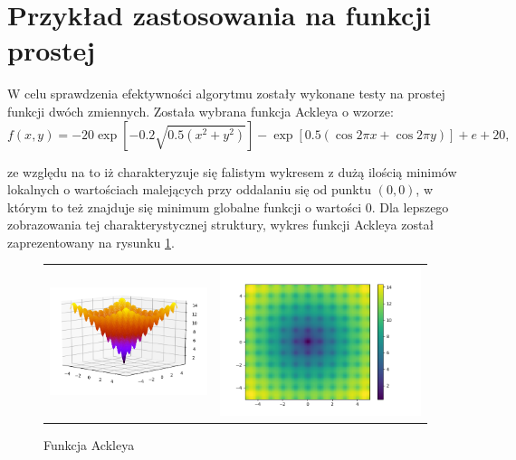
\section{Przykład zastosowania na funkcji prostej}
W celu sprawdzenia efektywności algorytmu zostały wykonane testy na prostej funkcji dwóch zmiennych. Została wybrana funkcja Ackleya o wzorze:
\begin{equation}
f(x,y) = -20\exp\left[-0.2\sqrt{0.5\left(x^{2}+y^{2}\right)}\right] -\exp\left[0.5\left(\cos 2\pi x + \cos 2\pi y \right)\right] + e + 20,
\end{equation}

ze względu na to iż charakteryzuje się falistym wykresem z dużą ilością minimów lokalnych o wartościach malejących przy oddalaniu się od punktu $(0, 0)$, w którym to też znajduje się minimum globalne funkcji o wartości 0. Dla lepszego zobrazowania tej charakterystycznej struktury, wykres funkcji Ackleya został zaprezentowany na rysunku \ref{fig:ackley}.

\begin{figure}[H]
    \centering
    \begin{tabular}{cc}
         \includegraphics[width=0.5\linewidth]{figures/ackley1.png}& \includegraphics[width=0.5\linewidth]{figures/ackley2.png}
    \end{tabular}
    \caption{Funkcja Ackleya}
    \label{fig:ackley}
\end{figure}

